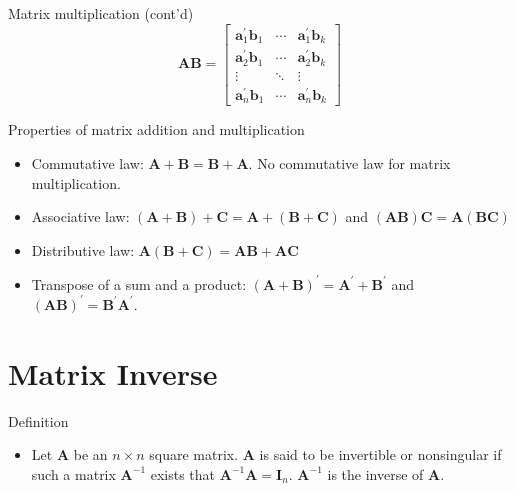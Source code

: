 \documentclass[presentation]{beamer}
\begin{document}
\begin{frame}[label={sec:orgabcfdc6}]{Matrix multiplication (cont'd)}
\begin{equation*}
\mathbf{AB} = 
\begin{bmatrix}
\mathbf{a}_1^{\prime} \mathbf{b}_1 & \cdots & \mathbf{a}_1^{\prime} \mathbf{b}_k \\
\mathbf{a}_2^{\prime} \mathbf{b}_1 & \cdots & \mathbf{a}_2^{\prime} \mathbf{b}_k \\
\vdots & \ddots & \vdots \\
\mathbf{a}_n^{\prime} \mathbf{b}_1 & \cdots & \mathbf{a}_n^{\prime} \mathbf{b}_k
\end{bmatrix}
\end{equation*}
\end{frame}

\begin{frame}[label={sec:org538615e}]{Properties of matrix addition and multiplication}
\begin{itemize}
\item \alert{Commutative law}: \(\mathbf{A} + \mathbf{B} = \mathbf{B} +
     \mathbf{A}\). No commutative law for matrix multiplication.

\item \alert{Associative law}: \((\mathbf{A} + \mathbf{B}) + \mathbf{C} =
     \mathbf{A} + (\mathbf{B} + \mathbf{C})\) and \((\mathbf{AB})
     \mathbf{C} = \mathbf{A} (\mathbf{BC})\)

\item \alert{Distributive law}: \(\mathbf{A} (\mathbf{B} + \mathbf{C}) =
     \mathbf{AB} + \mathbf{AC}\)

\item \alert{Transpose of a sum and a product}: \((\mathbf{A} +
  \mathbf{B})^{\prime} = \mathbf{A}^{\prime} + \mathbf{B}^{\prime}\)
and \((\mathbf{A} \mathbf{B})^{\prime} = \mathbf{B}^{\prime}
  \mathbf{A}^{\prime}\).
\end{itemize}
\end{frame}


\section{Matrix Inverse}
\label{sec:org76b118e}

\begin{frame}[label={sec:org85d1a76}]{Definition}
\begin{itemize}
\item Let \(\mathbf{A}\) be an \(n \times n\) square matrix. \(\mathbf{A}\) is
said to be \alert{invertible} or \alert{nonsingular} if such a matrix
\(\mathbf{A}^{-1}\) exists that \(\mathbf{A}^{-1} \mathbf{A} =
  \mathbf{I}_n\). \(\mathbf{A}^{-1}\) is the inverse of \(\mathbf{A}\).
\end{itemize}
\end{frame}
\end{document}
